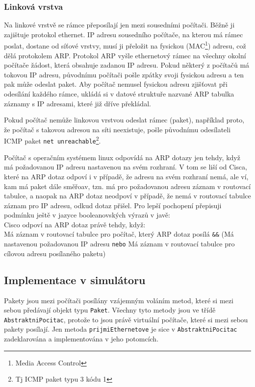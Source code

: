 \subsubsection{Linková vrstva}\label{skutecna_linkova_vrstva}

Na linkové vrstvě se rámce přeposílají jen mezi sousedními počítači. Běžně ji zajištuje protokol ethernet. IP adresu sousedního počítače, na kterou má rámec poslat, dostane od síťové vrstvy, musí ji přeložit na fysickou (MAC\footnote{Media Access Control}) adresu, což dělá protokolem ARP. Protokol ARP vyšle ethernetový rámec na všechny okolní počítače žádost, která obsahuje zadanou IP adresu. Pokud některý z počítačů má tokovou IP adresu, původnímu počítači pošle zpátky svoji fysickou adresu a ten pak může odeslat paket. Aby počítač nemusel fysickou adresu zjišťovat při odesílání každého rámce, ukládá si v datové struktuře nazvané ARP tabulka záznamy s IP adresami, které již dříve překládal.

Pokud počítač nemůže linkovou vrstvou odeslat rámec (paket), například proto, že počítač s takovou adresou na síti neexistuje,  pošle původnímu odesílateli ICMP paket \verb|net unreachable|\footnote{Tj ICMP paket typu 3 kódu 1}.

Počítač s operačním systémem linux odpovídá na ARP dotazy jen tehdy, když má požadovanou IP adresu nastavenou na svém rozhraní. V tom se liší od Cisca, které na ARP dotaz odpoví i v případě, že adresu na svém rozhraní nemá, ale ví, kam má paket dále směřoav, tzn. má pro požadovanou adresu záznam v routovací tabulce, a naopak na ARP dotaz neodpoví v případě, že nemá v routovací tabulce záznam pro IP adresu, odkud dotaz přišel. Pro lepší pochopení přepisuji podmínku ještě v jazyce booleanovských výrazů v javě:\\
Cisco odpoví na ARP dotaz právě tehdy, když:\\
Má záznam v routovací tabulce pro počítač, který ARP dotaz posílá \verb|&&| (Má nastavenou požadovanou IP adresu \verb|nebo| Má záznam v routovací tabulce pro cílovou adresu posílaného paketu)


\subsection{Implementace v simulátoru}

Pakety jsou mezi počítači posílány vzájemným voláním metod, které si mezi sebou předávají objekt typu \verb|Paket|. Všechny tyto metody jsou ve třídě \verb|AbstraktniPocitac|, protože to jsou právě virtuální počítače, které si mezi sebou pakety posílají. Jen metoda \verb|prijmiEthernetove| je sice v \verb|AbstraktniPocitac| zadeklarována a implementována v jeho potomcích.


